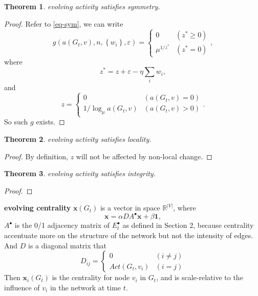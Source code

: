 \documentclass[12pt,abstract=true]{scrartcl}
\numberwithin{equation}{section}
\theoremstyle{definition}   \newtheorem{definition}{Definition}[section]
\theoremstyle{plain}        \newtheorem{theorem}{Theorem}[section]
\theoremstyle{plain}        \newtheorem{observation}{Observation}[section]
\theoremstyle{plain}        \newtheorem{fact}{Fact}[section]
\theoremstyle{plain}        \newtheorem{claim}{Claim}[section]
\theoremstyle{plain}        \newtheorem{lemma}[theorem]{Lemma}
\theoremstyle{plain}        \newtheorem{corollary}[theorem]{Corollary}
\theoremstyle{remark}       \newtheorem{example}{Example}[section]
\theoremstyle{remark}       \newtheorem{remark}{Remark}[section]
\begin{document}
\begin{theorem}
evolving activity satisfies symmetry.
\end{theorem}
\begin{proof}
Refer to \eqref{eq-sym}, we can write
\begin{equation}
g(a(G_t,v),n,\left\{w_i\right\},\varepsilon)=\begin{cases}
0 &(z^*\geq 0)\\
\mu^{1/z^*}& (z^*=0)
\end{cases},
\end{equation}
where
\begin{equation}
z^*=z+\varepsilon-\eta \sum_i w_i,
\end{equation}
and
\begin{equation}
z=\begin{cases}
0&(a(G_t,v)=0)\\
1/\log_{\mu}a(G_t,v)&(a(G_t,v)>0)
\end{cases}.
\end{equation}
So such $g$ exists.
\end{proof}

\begin{theorem}
evolving activity satisfies locality.
\end{theorem}
\begin{proof}
By definition, $z$ will not be affected by non-local change.
\end{proof}

\begin{theorem}
evolving activity satisfies integrity.
\end{theorem}
\begin{proof}
\end{proof}

 \textbf{evolving centrality} $\textbf{x}(G_t)$ is a vector in space
$\mathbb{R}^{|V|}$, where
\begin{equation}
\mathbf{x}=\alpha DA^\bullet \mathbf{x} + \beta\mathbf{1},
\end{equation}
$A^\bullet$ is the 0/1 adjacency matrix of $E^\bullet_t$ as defined in Section 2,
because centrality accentuate more on the structure of the network but not the
intensity of edges. And
$D$ is a diagonal matrix that
\begin{equation}
D_{ij}=\begin{cases}
0&(i\neq j)\\
\mathit{Act}(G_t,v_i)&(i=j)
\end{cases}
\end{equation}
Then $\textbf{x}_i(G_t)$ is the centrality for node $v_i$ in $G_t$, and is
scale-relative to the influence of $v_i$ in the network at time $t$.
\end{document}

